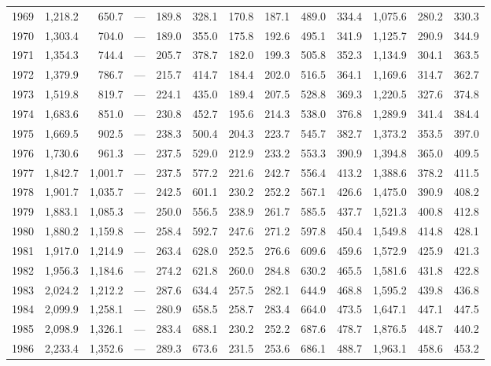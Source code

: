 \begin{longtable}{rrrrrrrrrrrrr}
1969 & 1,218.2 & 650.7 & --- & 189.8 & 328.1 & 170.8 & 187.1 & 489.0 & 334.4 & 1,075.6 & 280.2 & 330.3 \\
1970 & 1,303.4 & 704.0 & --- & 189.0 & 355.0 & 175.8 & 192.6 & 495.1 & 341.9 & 1,125.7 & 290.9 & 344.9 \\
1971 & 1,354.3 & 744.4 & --- & 205.7 & 378.7 & 182.0 & 199.3 & 505.8 & 352.3 & 1,134.9 & 304.1 & 363.5 \\
1972 & 1,379.9 & 786.7 & --- & 215.7 & 414.7 & 184.4 & 202.0 & 516.5 & 364.1 & 1,169.6 & 314.7 & 362.7 \\
1973 & 1,519.8 & 819.7 & --- & 224.1 & 435.0 & 189.4 & 207.5 & 528.8 & 369.3 & 1,220.5 & 327.6 & 374.8 \\
1974 & 1,683.6 & 851.0 & --- & 230.8 & 452.7 & 195.6 & 214.3 & 538.0 & 376.8 & 1,289.9 & 341.4 & 384.4 \\
1975 & 1,669.5 & 902.5 & --- & 238.3 & 500.4 & 204.3 & 223.7 & 545.7 & 382.7 & 1,373.2 & 353.5 & 397.0 \\
1976 & 1,730.6 & 961.3 & --- & 237.5 & 529.0 & 212.9 & 233.2 & 553.3 & 390.9 & 1,394.8 & 365.0 & 409.5 \\
1977 & 1,842.7 & 1,001.7 & --- & 237.5 & 577.2 & 221.6 & 242.7 & 556.4 & 413.2 & 1,388.6 & 378.2 & 411.5 \\
1978 & 1,901.7 & 1,035.7 & --- & 242.5 & 601.1 & 230.2 & 252.2 & 567.1 & 426.6 & 1,475.0 & 390.9 & 408.2 \\
1979 & 1,883.1 & 1,085.3 & --- & 250.0 & 556.5 & 238.9 & 261.7 & 585.5 & 437.7 & 1,521.3 & 400.8 & 412.8 \\
1980 & 1,880.2 & 1,159.8 & --- & 258.4 & 592.7 & 247.6 & 271.2 & 597.8 & 450.4 & 1,549.8 & 414.8 & 428.1 \\
1981 & 1,917.0 & 1,214.9 & --- & 263.4 & 628.0 & 252.5 & 276.6 & 609.6 & 459.6 & 1,572.9 & 425.9 & 421.3 \\
1982 & 1,956.3 & 1,184.6 & --- & 274.2 & 621.8 & 260.0 & 284.8 & 630.2 & 465.5 & 1,581.6 & 431.8 & 422.8 \\
1983 & 2,024.2 & 1,212.2 & --- & 287.6 & 634.4 & 257.5 & 282.1 & 644.9 & 468.8 & 1,595.2 & 439.8 & 436.8 \\
1984 & 2,099.9 & 1,258.1 & --- & 280.9 & 658.5 & 258.7 & 283.4 & 664.0 & 473.5 & 1,647.1 & 447.1 & 447.5 \\
1985 & 2,098.9 & 1,326.1 & --- & 283.4 & 688.1 & 230.2 & 252.2 & 687.6 & 478.7 & 1,876.5 & 448.7 & 440.2 \\
1986 & 2,233.4 & 1,352.6 & --- & 289.3 & 673.6 & 231.5 & 253.6 & 686.1 & 488.7 & 1,963.1 & 458.6 & 453.2 \\

\end{longtable}
